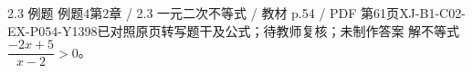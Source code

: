 \par\noindent\begin{minipage}{\linewidth}
\begin{bankitem}{2.3 例题 例题4}{第2章 / 2.3 一元二次不等式 / 教材 p.54 / PDF 第61页}{XJ-B1-C02-EX-P054-Y1398}{已对照原页转写题干及公式；待教师复核；未制作答案}
解不等式 $\dfrac{-2x+5}{x-2}>0$。
\end{bankitem}
\end{minipage}\par\medskip
